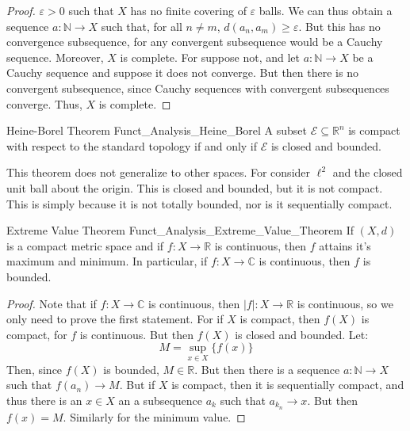\begin{proof}
            $\varepsilon>0$ such that $X$ has no finite
            covering of $\varepsilon$ balls. We can thus
            obtain a sequence $a:\mathbb{N}\rightarrow{X}$
            such that, for all $n\ne{m}$,
            $d(a_{n},a_{m})\geq\varepsilon$. But this
            has no convergence subsequence, for any convergent
            subsequence would be a Cauchy sequence. Moreover,
            $X$ is complete. For suppose not, and let
            $a:\mathbb{N}\rightarrow{X}$ be a Cauchy sequence
            and suppose it does not converge. But then there
            is no convergent subsequence, since Cauchy
            sequences with convergent subsequences converge.
            Thus, $X$ is complete.
        \end{proof}
        \begin{ltheorem}{Heine-Borel Theorem}
              {Funct_Analysis_Heine_Borel}
            A subset $\mathcal{E}\subseteq\mathbb{R}^{n}$ is
            compact with respect to the standard topology if and
            only if $\mathcal{E}$ is closed and bounded.
        \end{ltheorem}
        This theorem does not generalize to other spaces. For
        consider $\ell^{2}$ and the closed unit ball about the
        origin. This is closed and bounded, but it is not
        compact. This is simply because it is not totally
        bounded, nor is it sequentially compact.
        \begin{ltheorem}{Extreme Value Theorem}
              {Funct_Analysis_Extreme_Value_Theorem}
            If $(X,d)$ is a compact metric space and if
            $f:X\rightarrow\mathbb{R}$ is continuous, then
            $f$ attains it's maximum and minimum. In particular,
            if $f:X\rightarrow\mathbb{C}$ is continuous, then
            $f$ is bounded.
        \end{ltheorem}
        \begin{proof}
            Note that if $f:X\rightarrow\mathbb{C}$ is
            continuous, then $|f|:X\rightarrow\mathbb{R}$ is
            continuous, so we only need to prove the first
            statement. For if $X$ is compact, then $f(X)$ is
            compact, for $f$ is continuous. But then $f(X)$
            is closed and bounded. Let:
            \begin{equation}
                M=\underset{x\in{X}}\sup\{f(x)\}
            \end{equation}
            Then, since $f(X)$ is bounded, $M\in\mathbb{R}$.
            But then there is a sequence
            $a:\mathbb{N}\rightarrow{X}$ such that
            $f(a_{n})\rightarrow{M}$. But if $X$ is
            compact, then it is sequentially compact, and
            thus there is an $x\in{X}$ an a subsequence
            $a_{k}$ such that $a_{k_{n}}\rightarrow{x}$.
            But then $f(x)=M$. Similarly for the minimum value.
        \end{proof}